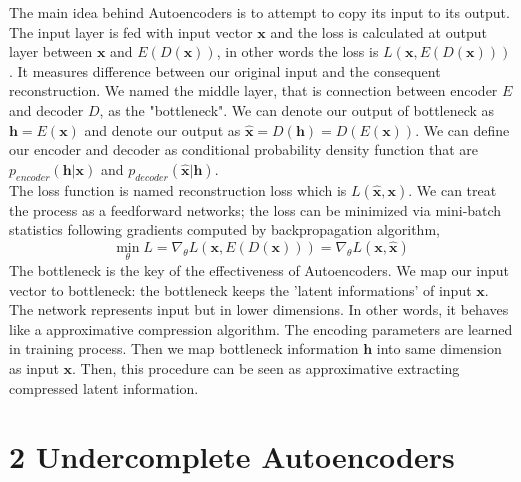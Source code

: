 \documentclass[11pt,twocolumn]{article}
\begin{document}
The main idea behind Autoencoders is to attempt to copy its input to its output. The input layer is fed with input vector $\mathbf{x}$ and the loss is calculated at output layer between $\mathbf{x}$ and $E(D(\mathbf{x}))$, in other words the loss is $L(\mathbf{x},E(D(\mathbf{x})))$. It measures difference between our original input and the consequent reconstruction.  We named the middle layer, that is connection between encoder $E$ and decoder $D$, as the "bottleneck". We can denote our output of bottleneck as $\mathbf{h} = E(\mathbf{x})$ and denote our output as $\mathbf{\hat{x}} = D(\mathbf{h}) = D(E(\mathbf{x}))$. We can define our encoder and decoder as conditional probability density function that are $p_{encoder}(\mathbf{h} | \mathbf{x})$ and $p_{decoder}(\mathbf{\hat{x}} | \mathbf{h})$. \\
The loss function is named reconstruction loss which is $L(\mathbf{\hat{x}},\mathbf{x})$. We can treat the process as a feedforward networks; the loss can be minimized via mini-batch statistics following gradients computed by backpropagation algorithm,
$$\min\limits_{\theta} L = \nabla_\theta L(\mathbf{x}, E(D(\mathbf{x}))) =\nabla_\theta L(\mathbf{x}, \mathbf{\hat{x}}) $$
The bottleneck is the key of the effectiveness of Autoencoders. We map our input vector to bottleneck: the bottleneck keeps the 'latent informations' of input $\mathbf{x}$. The network represents input but in lower dimensions. In other words, it behaves like a approximative compression algorithm. The encoding parameters are learned in training process. Then we map bottleneck information $\mathbf{h}$ into same dimension as input $\mathbf{x}$. Then, this procedure can be seen as approximative extracting compressed latent information.

\section{2 Undercomplete Autoencoders}
\end{document}
